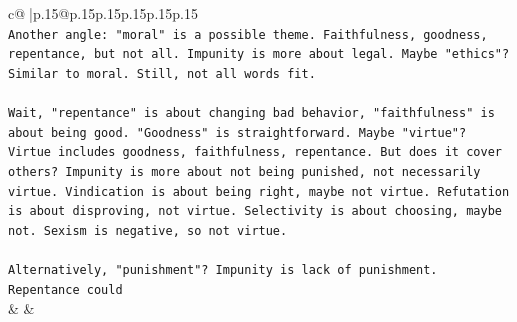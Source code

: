 \documentclass{article}
\begin{document}
{\begin{supertabular}{c@{$\;$}|p{.15\linewidth}@{}p{.15\linewidth}p{.15\linewidth}p{.15\linewidth}p{.15\linewidth}p{.15\linewidth}}
{{{\\ 
\texttt{Another angle: "moral" is a possible theme. Faithfulness, goodness, repentance, but not all. Impunity is more about legal. Maybe "ethics"? Similar to moral. Still, not all words fit.} \\
\\ 
\texttt{Wait, "repentance" is about changing bad behavior, "faithfulness" is about being good. "Goodness" is straightforward. Maybe "virtue"? Virtue includes goodness, faithfulness, repentance. But does it cover others? Impunity is more about not being punished, not necessarily virtue. Vindication is about being right, maybe not virtue. Refutation is about disproving, not virtue. Selectivity is about choosing, maybe not. Sexism is negative, so not virtue.} \\
\\ 
\texttt{Alternatively, "punishment"? Impunity is lack of punishment. Repentance could} \\
            }
        }
    }
    & & \\ \\


\end{supertabular}}
\end{document}
